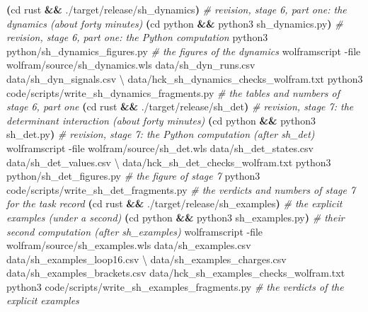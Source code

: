 \documentclass[
  10pt,
]{article}
\newenvironment{Shaded}{}{}
\newcommand{\AttributeTok}[1]{\textcolor[rgb]{0.49,0.56,0.16}{#1}}
\newcommand{\BuiltInTok}[1]{\textcolor[rgb]{0.00,0.50,0.00}{#1}}
\newcommand{\CommentTok}[1]{\textcolor[rgb]{0.38,0.63,0.69}{\textit{#1}}}
\newcommand{\DataTypeTok}[1]{\textcolor[rgb]{0.56,0.13,0.00}{#1}}
\newcommand{\ExtensionTok}[1]{#1}
\newcommand{\KeywordTok}[1]{\textcolor[rgb]{0.00,0.44,0.13}{\textbf{#1}}}
\newcommand{\NormalTok}[1]{#1}
\begin{document}
\begin{Shaded}
\begin{Highlighting}[]
\KeywordTok{(}\BuiltInTok{cd}\NormalTok{ rust }\KeywordTok{\&\&} \ExtensionTok{./target/release/sh\_dynamics}\KeywordTok{)}     \CommentTok{\# revision, stage 6, part one: the dynamics (about forty minutes)}
\KeywordTok{(}\BuiltInTok{cd}\NormalTok{ python }\KeywordTok{\&\&} \ExtensionTok{python3}\NormalTok{ sh\_dynamics.py}\KeywordTok{)}         \CommentTok{\# revision, stage 6, part one: the Python computation}
\ExtensionTok{python3}\NormalTok{ python/sh\_dynamics\_figures.py         }\CommentTok{\# the figures of the dynamics}
\ExtensionTok{wolframscript} \AttributeTok{{-}file}\NormalTok{ wolfram/source/sh\_dynamics.wls data/sh\_dyn\_runs.csv data/sh\_dyn\_signals.csv }\DataTypeTok{\textbackslash{}}
\NormalTok{    data/hck\_sh\_dynamics\_checks\_wolfram.txt}
\ExtensionTok{python3}\NormalTok{ code/scripts/write\_sh\_dynamics\_fragments.py }\CommentTok{\# the tables and numbers of stage 6, part one}
\KeywordTok{(}\BuiltInTok{cd}\NormalTok{ rust }\KeywordTok{\&\&} \ExtensionTok{./target/release/sh\_det}\KeywordTok{)}          \CommentTok{\# revision, stage 7: the determinant interaction (about forty minutes)}
\KeywordTok{(}\BuiltInTok{cd}\NormalTok{ python }\KeywordTok{\&\&} \ExtensionTok{python3}\NormalTok{ sh\_det.py}\KeywordTok{)}              \CommentTok{\# revision, stage 7: the Python computation (after sh\_det)}
\ExtensionTok{wolframscript} \AttributeTok{{-}file}\NormalTok{ wolfram/source/sh\_det.wls data/sh\_det\_states.csv data/sh\_det\_values.csv }\DataTypeTok{\textbackslash{}}
\NormalTok{    data/hck\_sh\_det\_checks\_wolfram.txt}
\ExtensionTok{python3}\NormalTok{ python/sh\_det\_figures.py              }\CommentTok{\# the figure of stage 7}
\ExtensionTok{python3}\NormalTok{ code/scripts/write\_sh\_det\_fragments.py }\CommentTok{\# the verdicts and numbers of stage 7 for the task record}
\KeywordTok{(}\BuiltInTok{cd}\NormalTok{ rust }\KeywordTok{\&\&} \ExtensionTok{./target/release/sh\_examples}\KeywordTok{)}     \CommentTok{\# the explicit examples (under a second)}
\KeywordTok{(}\BuiltInTok{cd}\NormalTok{ python }\KeywordTok{\&\&} \ExtensionTok{python3}\NormalTok{ sh\_examples.py}\KeywordTok{)}         \CommentTok{\# their second computation (after sh\_examples)}
\ExtensionTok{wolframscript} \AttributeTok{{-}file}\NormalTok{ wolfram/source/sh\_examples.wls data/sh\_examples.csv data/sh\_examples\_loop16.csv }\DataTypeTok{\textbackslash{}}
\NormalTok{    data/sh\_examples\_charges.csv data/sh\_examples\_brackets.csv data/hck\_sh\_examples\_checks\_wolfram.txt}
\ExtensionTok{python3}\NormalTok{ code/scripts/write\_sh\_examples\_fragments.py }\CommentTok{\# the verdicts of the explicit examples}

\end{Highlighting}
\end{Shaded}
\end{document}
